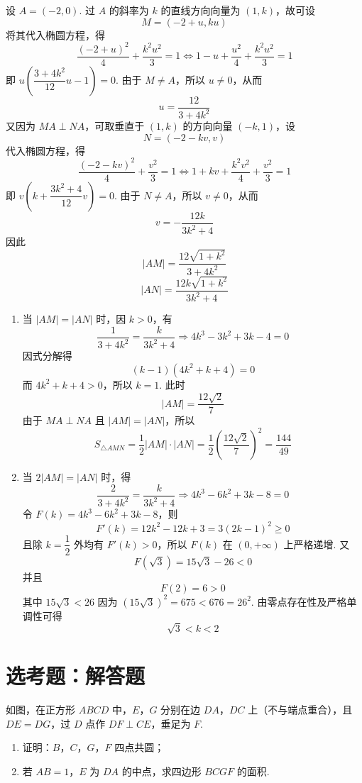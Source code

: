 \begin{solution}
设 \(A=(-2,0)\). 过 \(A\) 的斜率为 \(k\) 的直线方向向量为 \((1,k)\)，故可设
\[
M=(-2+u,ku)
\]
将其代入椭圆方程，得
\[
\dfrac{(-2+u)^2}{4}+\dfrac{k^2u^2}{3}=1
\Longleftrightarrow 1-u+\dfrac{u^2}{4}+\dfrac{k^2u^2}{3}=1
\]
即 \(u\left(\dfrac{3+4k^2}{12}u-1\right)=0\).
由于 \(M\neq A\)，所以 \(u\neq0\)，从而
\[
u=\dfrac{12}{3+4k^2}
\]
又因为 \(MA\perp NA\)，可取垂直于 \((1,k)\) 的方向向量 \((-k,1)\)，设
\[
N=(-2-kv,v)
\]
代入椭圆方程，得
\[
\dfrac{(-2-kv)^2}{4}+\dfrac{v^2}{3}=1
\Longleftrightarrow 1+kv+\dfrac{k^2v^2}{4}+\dfrac{v^2}{3}=1
\]
即 \(v\left(k+\dfrac{3k^2+4}{12}v\right)=0\).
由于 \(N\neq A\)，所以 \(v\neq0\)，从而
\[
v=-\dfrac{12k}{3k^2+4}
\]
因此
\[
|AM|=\dfrac{12\sqrt{1+k^2}}{3+4k^2}
\]
\[
|AN|=\dfrac{12k\sqrt{1+k^2}}{3k^2+4}
\]
\begin{enumerate}
\item 当 \(|AM|=|AN|\) 时，因 \(k>0\)，有
\[
\dfrac1{3+4k^2}=\dfrac{k}{3k^2+4}
\Longrightarrow 4k^3-3k^2+3k-4=0
\]
因式分解得
\[
(k-1)(4k^2+k+4)=0
\]
而 \(4k^2+k+4>0\)，所以 \(k=1\). 此时
\[
|AM|=\dfrac{12\sqrt2}{7}
\]
由于 \(MA\perp NA\) 且 \(|AM|=|AN|\)，所以
\[
S_{\triangle AMN}=\dfrac12|AM|\cdot|AN|=\dfrac12\left(\dfrac{12\sqrt2}{7}\right)^2=\dfrac{144}{49}
\]

\item 当 \(2|AM|=|AN|\) 时，得
\[
\dfrac2{3+4k^2}=\dfrac{k}{3k^2+4}
\Longrightarrow 4k^3-6k^2+3k-8=0
\]
令 \(F(k)=4k^3-6k^2+3k-8\)，则
\[
F'(k)=12k^2-12k+3=3(2k-1)^2\geq0
\]
且除 \(k=\dfrac12\) 外均有 \(F'(k)>0\)，所以 \(F(k)\) 在 \((0,+\infty)\) 上严格递增. 又
\[
F(\sqrt3)=15\sqrt3-26<0
\]
并且
\[
F(2)=6>0
\]
其中 \(15\sqrt3<26\) 因为 \((15\sqrt3)^2=675<676=26^2\). 由零点存在性及严格单调性可得
\[
\sqrt3<k<2
\]
\end{enumerate}
\end{solution}


\section{选考题：解答题}

\begin{problem}
如图，在正方形 \(ABCD\) 中，\(E\)，\(G\) 分别在边 \(DA\)，\(DC\) 上（不与端点重合），且 \(DE=DG\)，过 \(D\) 点作 \(DF\perp CE\)，垂足为 \(F\).
\begin{enumerate}
\item 证明：\(B\)，\(C\)，\(G\)，\(F\) 四点共圆；
\item 若 \(AB=1\)，\(E\) 为 \(DA\) 的中点，求四边形 \(BCGF\) 的面积.
\end{enumerate}

\begingroup
{}
\endgroup
\end{problem}

